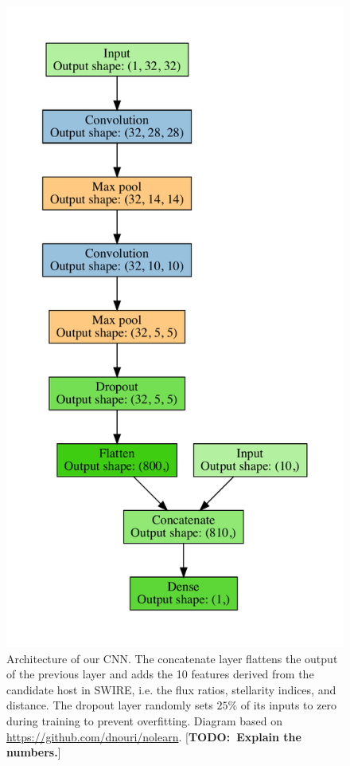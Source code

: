 \documentclass[fleqn,usenatbib,usedcolumn]{mnras}
\newcommand{\todo}[1]{ {\color{red}[{\bf TODO:~{#1}}]} }
\begin{document}
    \begin{figure}
      \includegraphics[width=\linewidth]{images/cnn_model_graph}
      \caption{Architecture of our CNN. The concatenate layer flattens the
      output of the previous layer and adds the 10 features derived from the
      candidate host in SWIRE, i.e. the flux ratios, stellarity indices, and
      distance. The dropout layer randomly sets $25\%$ of its inputs to zero
      during training to prevent overfitting. Diagram based on \url{
      https://github.com/dnouri/nolearn}. \todo{Explain the numbers.}}
      \label{fig:cnn}
    \end{figure}
\end{document}
